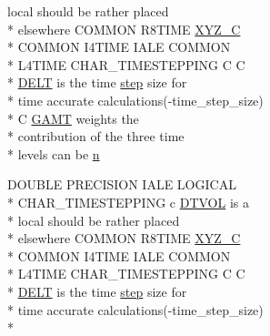 \begin{DoxyCompactItemize}
local should be rather placed \\*
elsewhere C\-O\-M\-M\-O\-N R8\-T\-I\-M\-E \hyperlink{home_2abonfi_2_c_f_d__codes_2_eul_f_s_83_84_2include_2time_8com_aea163e1b1768adcd9e1f052e8e713145}{X\-Y\-Z\-\_\-\-C} \\*
C\-O\-M\-M\-O\-N I4\-T\-I\-M\-E I\-A\-L\-E C\-O\-M\-M\-O\-N \\*
L4\-T\-I\-M\-E C\-H\-A\-R\-\_\-\-T\-I\-M\-E\-S\-T\-E\-P\-P\-I\-N\-G C C \\*
\hyperlink{msa20_2home_2abonfi_2_c_f_d__codes_2_eul_f_s_83_82_83_2include_2time_8com_acb1f2f1a9ae66911a5f4605d8be61030}{D\-E\-L\-T} is the time \hyperlink{home_2abonfi_2_c_f_d__codes_2_eul_f_s_83_84_2include_2time_8com_a3afa77097ad8466eb34858ba6f60aad2}{step} size for \\*
time accurate calculations(-\/time\-\_\-step\-\_\-size) \\*
C \hyperlink{msa20_2home_2abonfi_2_c_f_d__codes_2_eul_f_s_83_82_83_2include_2time_8com_a13b288a3cbd362cd91ab8edbfe0c08ee}{G\-A\-M\-T} weights the \\*
contribution of the three time \\*
levels can be \hyperlink{home_2abonfi_2_c_f_d__codes_2_eul_f_s_83_84_2include_2time_8com_a24bdc4a048267ff98f6f8137112e6f2f}{n}
\item 
D\-O\-U\-B\-L\-E P\-R\-E\-C\-I\-S\-I\-O\-N I\-A\-L\-E L\-O\-G\-I\-C\-A\-L \\*
C\-H\-A\-R\-\_\-\-T\-I\-M\-E\-S\-T\-E\-P\-P\-I\-N\-G c \hyperlink{msa20_2home_2abonfi_2_c_f_d__codes_2_eul_f_s_83_82_83_2include_2time_8com_a00486054a38d678ac27310774f9c3d36}{D\-T\-V\-O\-L} is a \\*
local should be rather placed \\*
elsewhere C\-O\-M\-M\-O\-N R8\-T\-I\-M\-E \hyperlink{home_2abonfi_2_c_f_d__codes_2_eul_f_s_83_84_2include_2time_8com_aea163e1b1768adcd9e1f052e8e713145}{X\-Y\-Z\-\_\-\-C} \\*
C\-O\-M\-M\-O\-N I4\-T\-I\-M\-E I\-A\-L\-E C\-O\-M\-M\-O\-N \\*
L4\-T\-I\-M\-E C\-H\-A\-R\-\_\-\-T\-I\-M\-E\-S\-T\-E\-P\-P\-I\-N\-G C C \\*
\hyperlink{msa20_2home_2abonfi_2_c_f_d__codes_2_eul_f_s_83_82_83_2include_2time_8com_acb1f2f1a9ae66911a5f4605d8be61030}{D\-E\-L\-T} is the time \hyperlink{home_2abonfi_2_c_f_d__codes_2_eul_f_s_83_84_2include_2time_8com_a3afa77097ad8466eb34858ba6f60aad2}{step} size for \\*
time accurate calculations(-\/time\-\_\-step\-\_\-size) \\*

\end{DoxyCompactItemize}

